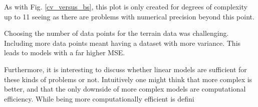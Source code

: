 As with Fig. \ref{cv_versus_bs}, this plot is only created for degrees of complexity up to 11 seeing as there are problems with numerical precision beyond this point. 


Choosing the number of data points for the terrain data was challenging. Including more data points meant having a dataset with more variance. This leads to models with a far higher MSE. 


Furthermore, it is interesting to discuss whether linear models are sufficient for these kinds of problems or not. Intuitively one might think that more complex is better, and that the only downside of more complex models are computational efficiency. While being more computationally efficient is defini

